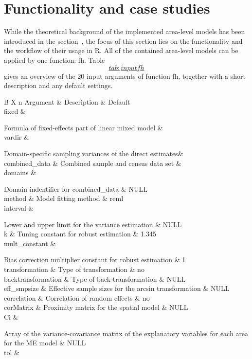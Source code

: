 \hypertarget{sec:functionality}{%
\section{Functionality and case studies}\label{sec:functionality}}

While the theoretical background of the implemented area-level models
has been introduced in the section~, the focus of this section lies on
the functionality and the workflow of their usage in R. All of the
contained area-level models can be applied by one function: fh.
Table~\protect\hyperlink{tab:inputfh}{\[tab:inputfh\]} gives an overview of the 20 input arguments of
function fh, together with a short description and any default settings.

B X n Argument \& Description \& Default\\
fixed \&

Formula of fixed-effects part of linear mixed model \&\\
vardir \&

Domain-specific sampling variances of the direct estimates\&\\
combined\_data \& Combined sample and census data set \&\\
domains \&

Domain indentifier for combined\_data \& NULL\\
method \& Model fitting method \& reml\\
interval \&

Lower and upper limit for the variance estimation \& NULL\\
k \& Tuning constant for robust estimation \& 1.345\\
mult\_constant \&

Bias correction multiplier constant for robust estimation \& 1\\
transformation \& Type of transformation \& no\\
backtransformation \& Type of back-transformation \& NULL\\
eff\_smpsize \& Effective sample sizes for the arcsin transformation \&
NULL\\
correlation \& Correlation of random effects \& no\\
corMatrix \& Proximity matrix for the spatial model \& NULL\\
Ci \&

Array of the variance-covariance matrix of the explanatory variables for
each area for the ME model \& NULL\\
tol \&

